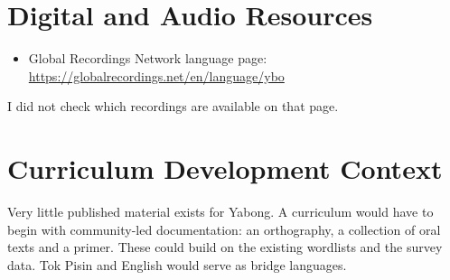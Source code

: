 \documentclass[12pt]{article}
\begin{document}
\section{Digital and Audio Resources}
\begin{itemize}
\item Global Recordings Network language page: \url{https://globalrecordings.net/en/language/ybo}
\end{itemize}
I did not check which recordings are available on that page.

\section{Curriculum Development Context}
Very little published material exists for Yabong. A curriculum would have to begin with community-led documentation: an orthography, a collection of oral texts and a primer. These could build on the existing wordlists and the survey data. Tok Pisin and English would serve as bridge languages.
\end{document}
